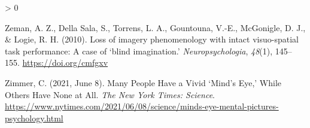 \documentclass[
  oneside,
  12pt]{crumpbook}
\newlength{\cslhangindent}
\newenvironment{CSLReferences}[2] %
 {%
  \setlength{\parindent}{0pt}
  \ifodd #1 \everypar{\setlength{\hangindent}{\cslhangindent}}\ignorespaces\fi
  \ifnum #2 > 0
  \setlength{\parskip}{#2\baselineskip}
  \fi
 }%
 {}
\begin{document}
\begin{CSLReferences}{1}{0}
\leavevmode\hypertarget{ref-zemanLossImageryPhenomenology2010}{}%
Zeman, A. Z., Della Sala, S., Torrens, L. A., Gountouna, V.-E., McGonigle, D. J., \& Logie, R. H. (2010). Loss of imagery phenomenology with intact visuo-spatial task performance: {A} case of {`blind imagination.'} \emph{Neuropsychologia}, \emph{48}(1), 145--155. \url{https://doi.org/cmfgxv}

\leavevmode\hypertarget{ref-zimmerManyPeopleHave2021}{}%
Zimmer, C. (2021, June 8). Many {People Have} a {Vivid} {`{Mind}'s {Eye},'} {While Others Have None} at {All}. \emph{The New York Times: Science}. \url{https://www.nytimes.com/2021/06/08/science/minds-eye-mental-pictures-psychology.html}

\end{CSLReferences}
\end{document}
